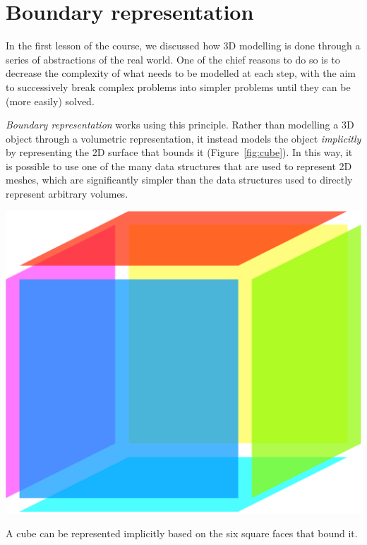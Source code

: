 
\setchapterpreamble[u]{\margintoc}

\graphicspath{{brep/}}
\renewcommand*{\thelesson}{1.2}

\chapter{Boundary representation}%
\label{chap:brep}

In the first lesson of the course, we discussed how 3D modelling is done through a series of abstractions of the real world.
One of the chief reasons to do so is to decrease the complexity of what needs to be modelled at each step, with the aim to successively break complex problems into simpler problems until they can be (more easily) solved.

\emph{Boundary representation} works using this principle.
Rather than modelling a 3D object through a volumetric representation, it instead models the object \emph{implicitly} by representing the 2D surface that bounds it (Figure~\ref{fig:cube}).
In this way, it is possible to use one of the many data structures that are used to represent 2D meshes, which are significantly simpler than the data structures used to directly represent arbitrary volumes.

\begin{marginfigure}
\centering
\includegraphics[width=\linewidth]{figs/cube.pdf}
\caption{A cube can be represented implicitly based on the six square faces that bound it.}%
\label{fig:cube}
\end{marginfigure}

